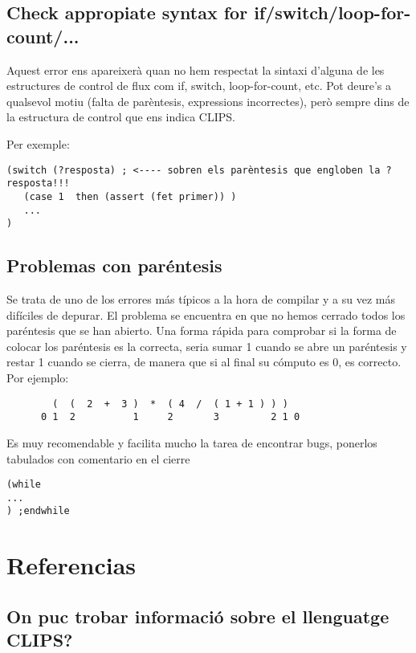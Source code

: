 \documentclass[11pt,svgnames]{scrbook}
\begin{document}
\section{Check appropiate syntax for if/switch/loop-for-count/...}


Aquest error ens apareixerà quan no hem respectat la sintaxi d'alguna de les estructures de control de flux com if, switch, loop-for-count, etc. Pot deure's a qualsevol motiu (falta de parèntesis, expressions incorrectes), però sempre dins de la estructura de control que ens indica CLIPS.

Per exemple:

\begin{verbatim}
(switch (?resposta) ; <---- sobren els parèntesis que engloben la ?resposta!!!
   (case 1  then (assert (fet primer)) )
   ...
)
\end{verbatim}


\section{Problemas con paréntesis}

Se trata de uno de los errores más típicos a la hora de compilar y a su vez más difíciles de depurar. El problema se encuentra en que no hemos cerrado todos los paréntesis que se han abierto.
Una forma rápida para comprobar si la forma de colocar los paréntesis es la correcta, seria sumar 1 cuando se abre un paréntesis y restar 1 cuando se cierra, de manera que si al final su cómputo es 0, es correcto. Por ejemplo:


\begin{verbatim}
        (  (  2  +  3 )  *  ( 4  /  ( 1 + 1 ) ) )
      0 1  2          1     2       3         2 1 0
\end{verbatim}
Es muy recomendable y facilita mucho la tarea de encontrar bugs, ponerlos tabulados con comentario en el cierre

\begin{verbatim}
(while
...
) ;endwhile
\end{verbatim}

\chapter{Referencias}

\section{On puc trobar informació sobre el llenguatge CLIPS?}
\end{document}
